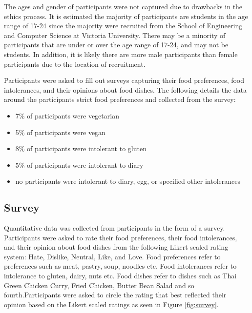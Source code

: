 The ages and gender of participants were not captured due to drawbacks in the ethics process. It is estimated the majority of participants are students in the age range of 17-24 since the majority were recruited from the School of Engineering and Computer Science at Victoria University. There may be a minority of participants that are under or over the age range of 17-24, and may not be students. In addition, it is likely there are more male participants than female participants due to the location of recruitment.

Participants were asked to fill out surveys capturing their food preferences, food intolerances, and their opinions about food dishes. The following details the data around the participants strict food preferences and collected from the survey:
\begin{itemize}
	\item{7\% of participants were vegetarian}
	\item{5\% of participants were vegan}
	\item{8\% of participants were intolerant to gluten}
	\item{5\% of participants were intolerant to diary}
	\item{no participants were intolerant to diary, egg, or specified other intolerances}
\end{itemize}

\subsection{Survey}

Quantitative data was collected from participants in the form of a survey. Participants were asked to rate their food preferences, their food intolerances, and their opinion about food dishes from the following Likert scaled rating system: Hate, Dislike, Neutral, Like, and Love. Food preferences refer to preferences such as meat, pastry, soup, noodles etc. Food intolerances refer to intolerance to gluten, dairy, nuts etc. Food dishes refer to dishes such as Thai Green Chicken Curry, Fried Chicken, Butter Bean Salad and so fourth.Participants were asked to circle the rating that best reflected their opinion based on the Likert scaled ratings as seen in Figure \ref{fig:survey}. 


